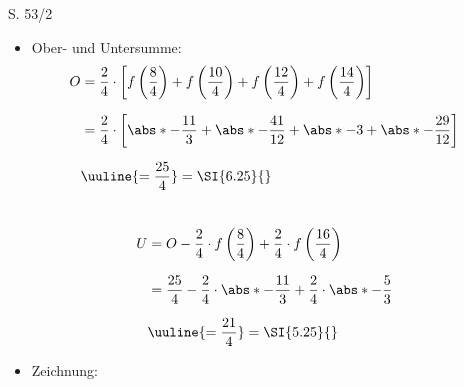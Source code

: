 \begin{Exercise}{S. 53/2}{}
\begin{enumerate}[leftmargin=*]
\begin{enumerate}[label=\alph*),leftmargin=*]
{\begin{itemize}[leftmargin=*]
{\begin{minipage}[t]{0.55\linewidth}
\begin{tabularx}{0.95\linewidth}{c|X|X|X}
                        \end{tabularx}
                    \end{minipage}\\
                    $\Rightarrow \quad G_{f}$ ist smf in $\left] \ -\infty; \frac{3}{2} \ \right]$ und sms in $\left[ \ \frac{3}{2}; \infty \ \right[$\\[-1.0ex]
                    }
                \item Ober- und Untersumme: \\[-2.0ex]{
                    \begin{align*}
                        O &= \dfrac{2}{4} \cdot \left[f\left(\dfrac{8}{4}\right) + f\left(\dfrac{10}{4}\right) + f\left(\dfrac{12}{4}\right) + f\left(\dfrac{14}{4}\right)\right] && \\[1.5ex]
                        &= \dfrac{2}{4} \cdot \left[\abs*{-\dfrac{11}{3}} + \abs*{-\dfrac{41}{12}} + \abs*{-3} + \abs*{-\dfrac{29}{12}} \right] && \\[1.5ex]
                        &\uuline{= \dfrac{25}{4}} = \SI{6.25}{} &&
                    \end{align*}\\[-2.0ex]
                    \begin{align*}
                        U &= O - \dfrac{2}{4} \cdot f\left(\dfrac{8}{4}\right) + \dfrac{2}{4} \cdot f\left(\dfrac{16}{4}\right) && \\[1.5ex]
                        &= \dfrac{25}{4} - \dfrac{2}{4} \cdot \abs*{-\dfrac{11}{3}} + \dfrac{2}{4} \cdot \abs*{-\dfrac{5}{3}} && \\[1.5ex]
                        &\uuline{= \dfrac{21}{4}} = \SI{5.25}{} &&
                    \end{align*}
                }
                \item Zeichnung: \\[-2.0ex]{
                    }
\end{itemize}}
\end{enumerate}
\end{enumerate}
\end{Exercise}
